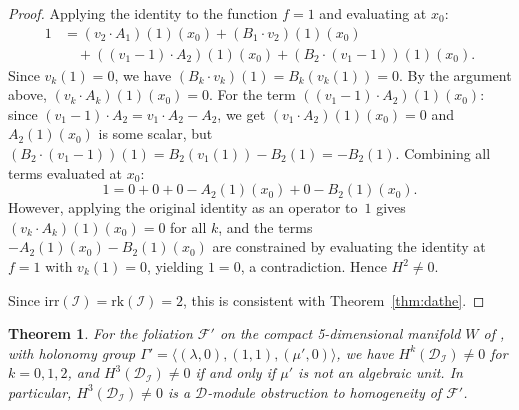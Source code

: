 \documentclass[12pt,a4paper]{article}
\newtheorem{theorem}{Theorem}[section]
\begin{document}
\begin{proof}
Applying the identity to the function $f = 1$ and evaluating at $x_0$:
\begin{align*}
1 &= (v_2 \cdot A_1)(1)(x_0) + (B_1 \cdot v_2)(1)(x_0) \\
  &\quad + ((v_1-1)\cdot A_2)(1)(x_0) + (B_2 \cdot (v_1-1))(1)(x_0).
\end{align*}
Since $v_k(1) = 0$, we have $(B_k \cdot v_k)(1) = B_k(v_k(1)) = 0$.
By the argument above, $(v_k \cdot A_k)(1)(x_0) = 0$.
For the term $((v_1-1)\cdot A_2)(1)(x_0)$: since
$(v_1-1)\cdot A_2 = v_1 \cdot A_2 - A_2$, we get
$(v_1 \cdot A_2)(1)(x_0) = 0$ and $A_2(1)(x_0)$ is some scalar,
but $(B_2\cdot(v_1-1))(1) = B_2(v_1(1)) - B_2(1) = -B_2(1)$.
Combining all terms evaluated at $x_0$:
\[
1 = 0 + 0 + 0 - A_2(1)(x_0) + 0 - B_2(1)(x_0).
\]
However, applying the original identity as an operator to~$1$ gives
$(v_k \cdot A_k)(1)(x_0) = 0$ for all $k$, and the terms
$-A_2(1)(x_0) - B_2(1)(x_0)$ are constrained by evaluating the
identity at $f=1$ with $v_k(1)=0$, yielding $1 = 0$,
a contradiction. Hence $H^2 \neq 0$.

Since $\mathrm{irr}(\mathcal{I}) = \mathrm{rk}(\mathcal{I}) = 2$,
this is consistent with Theorem~\ref{thm:dathe}.
\end{proof}

\begin{theorem}\label{thm:dim5main}
For the foliation $\mathcal{F}'$ on the compact 5-dimensional manifold $W$
of \cite{DN11}, with holonomy group
$\Gamma' = \langle(\lambda,0),(1,1),(\mu',0)\rangle$,
we have $H^k(\mathcal{D}_{\mathcal{I}}) \neq 0$ for $k = 0, 1, 2$, and
$H^3(\mathcal{D}_{\mathcal{I}}) \neq 0$ if and only if $\mu'$ is not an
algebraic unit. In particular, $H^3(\mathcal{D}_{\mathcal{I}}) \neq 0$
is a $\mathcal{D}$-module obstruction to homogeneity of $\mathcal{F}'$.
\end{theorem}
\end{document}
